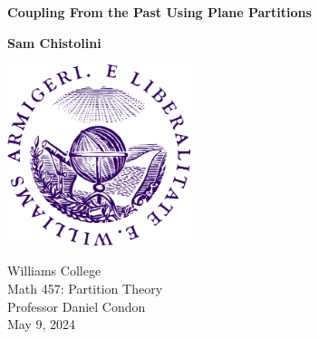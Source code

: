 \begin{titlepage}
   \begin{center}
       \vspace*{1cm}

       \textbf{Coupling From the Past Using Plane Partitions}

            
       \vspace{1.5cm}

       \textbf{Sam Chistolini}

       \vfill
            
            
     
       \includegraphics[width=0.4\textwidth]{university}
            
    Williams College\\
       Math 457: Partition Theory\\
      
       Professor Daniel Condon\\
       May 9, 2024\\
            
   \end{center}
\end{titlepage}